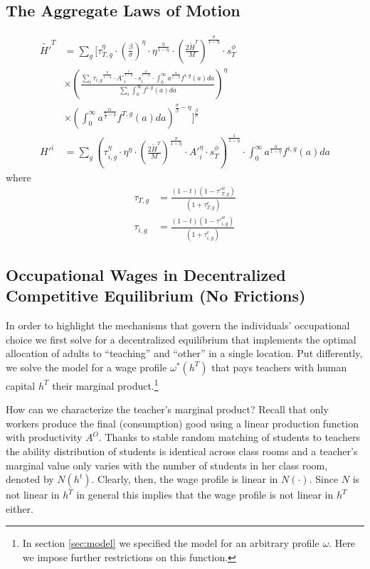 \documentclass[onehalfspacing,11pt]{article}
\newtheorem{prp}{Proposition}
\begin{document}
\subsection{The Aggregate Laws of Motion}
\begin{align}
\widetilde{H'}^{T} & = \sum_g \Bigg[ \tau_{T,g}^\eta \cdot \left(\tfrac{\beta}{\sigma}\right)^\eta  \cdot \eta^{\frac{\eta}{1-\eta}} \cdot \left(\tfrac{2\widetilde{H}^T}{M}\right)^{\frac{\sigma}{1-\eta}} \cdot s_T^\phi \nonumber\\
& \times \left(\frac{\sum_i {\tau_{i,g}}^{\frac{\eta}{1-\eta}} \cdot {A'}_i^{\frac{1}{1-\eta}} \cdot s_i^{\frac{\phi}{1-\eta}} \cdot \int_0^\infty a^{\frac{\alpha}{1-\eta}} f^{i,g}(a)da }{\sum_i \int_0^\infty f^{i,g}(a)da}\right)^\eta \nonumber\\
& \times \left(\int_0^\infty a^{\frac{\alpha}{\frac{\sigma}{\beta}-\eta}} f^{T,g}(a)da\right)^{\frac{\sigma}{\beta}-\eta} \Bigg]^{\frac{\beta}{\sigma}}\\
{H'}^{i} & = \sum_g \left( \tau_{i,g}^\eta \cdot \eta^\eta \cdot \left(\tfrac{2\widetilde{H}^T}{M}\right)^\frac{\sigma}{1-\eta}\cdot {A'}_i^\eta \cdot s_T^\phi \right)^\frac{1}{1-\eta}\cdot \int_0^\infty a^{\frac{\alpha}{1-\eta}} f^{i,g}(a)da
\end{align}
where
\begin{align}
\tau_{T,g} & =\frac{(1-t)(1-{\tau'}_{T,g}^w)}{(1+\tau_{T,g}^e)} \nonumber\\
\tau_{i,g} & =\frac{(1-t)(1-{\tau'}_{i,g}^w)}{(1+\tau_{i,g}^e)} \nonumber
\end{align}

\subsection{Occupational Wages in Decentralized Competitive Equilibrium (No Frictions)}
In order to highlight the mechanisms that govern the individuals' occupational choice we first solve for a decentralized equilibrium that implements the optimal allocation of adults to ``teaching'' and ``other'' in a single location. Put differently, we solve the model for a wage profile $\omega^*(h^T)$ that pays teachers with human capital $h^T$ their marginal product.\footnote{In section \ref{sec:model} we specified the model for an arbitrary profile $\omega$. Here we impose further restrictions on this function.}

How can we characterize the teacher's marginal product? Recall that only workers produce the final (consumption) good using a linear production function with productivity $A^O$. Thanks to stable random matching of students to teachers the ability distribution of students is identical across class rooms and a teacher's marginal value only varies with the number of students in her class room, denoted by $N(h^t)$. Clearly, then, the wage profile is linear in $N(\cdot)$. Since $N$ is not linear in $h^T$ in general this implies that the wage profile is not linear in $h^T$ either.
\end{document}
